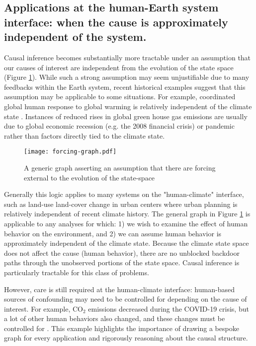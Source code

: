 \documentclass[12pt]{article}
\begin{document}
\subsection{Applications at the human-Earth system interface: when the
  cause is approximately independent of the system.}
\label{human}

Causal inference becomes substantially more tractable under an
assumption that our causes of interest are independent from the
evolution of the state space (Figure \ref{fig:forcing}). While such a
strong assumption may seem unjustifiable due to many feedbacks within
the Earth system, recent historical examples suggest that this
assumption may be applicable to some situations. For example,
coordinated global human response to global warming is relatively
independent of the climate state \citep{arto2014drivers}. Instances of
reduced rises in global green house gas emissions are usually due to
global economic recession (e.g. the 2008 financial crisis) or pandemic
\citep[COVID-19 crisis,][]{le2020temporary, liu2020near} rather than
factors directly tied to the climate state.

\begin{figure} \texttt{[image: forcing-graph.pdf]}
  \caption{A generic graph asserting an assumption that there are
    forcing external to the evolution of the state-space}
  \label{fig:forcing}
\end{figure}

Generally this logic applies to many systems on the "human-climate"
interface, such as land-use land-cover change in urban centers where
urban planning is relatively independent of recent climate
history. The general graph in Figure \ref{fig:forcing} is applicable
to any analyses for which: 1) we wish to examine the effect of human
behavior on the environment, and 2) we can assume human behavior is
approximately independent of the climate state. Because the climate
state space does not affect the cause (human behavior), there are no
unblocked backdoor paths through the unobserved portions of the state
space. Causal inference is particularly tractable for this class of
problems.

However, care is still required at the human-climate interface:
human-based sources of confounding may need to be controlled for
depending on the cause of interest. For example, CO$_2$ emissions
decreased during the COVID-19 crisis, but a lot of other human
behaviors also changed, and these changes must be controlled for
\citep[e.g., the COVID-19 virus is a common cause to many large
changes in human behavior in 2020,][]{diffenbaugh2020covid}. This
example highlights the importance of drawing a bespoke graph for every
application and rigorously reasoning about the causal structure.
\end{document}
